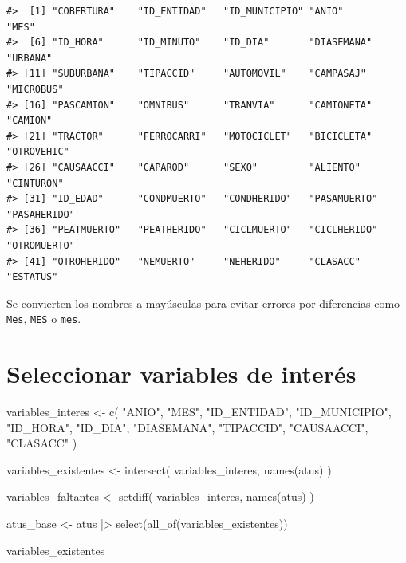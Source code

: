 \documentclass[
  spanish,
  10.5pt,
  letterpaper,
  openany,
  headings=big]{scrbook}
\newenvironment{Shaded}{}{}
\newcommand{\FunctionTok}[1]{\textcolor[rgb]{0.44,0.26,0.76}{#1}}
\newcommand{\NormalTok}[1]{\textcolor[rgb]{0.14,0.16,0.18}{#1}}
\newcommand{\OtherTok}[1]{\textcolor[rgb]{0.44,0.26,0.76}{#1}}
\newcommand{\SpecialCharTok}[1]{\textcolor[rgb]{0.00,0.36,0.77}{#1}}
\newcommand{\StringTok}[1]{\textcolor[rgb]{0.01,0.18,0.38}{#1}}
\begin{document}
\begin{verbatim}
#>  [1] "COBERTURA"    "ID_ENTIDAD"   "ID_MUNICIPIO" "ANIO"         "MES"         
#>  [6] "ID_HORA"      "ID_MINUTO"    "ID_DIA"       "DIASEMANA"    "URBANA"      
#> [11] "SUBURBANA"    "TIPACCID"     "AUTOMOVIL"    "CAMPASAJ"     "MICROBUS"    
#> [16] "PASCAMION"    "OMNIBUS"      "TRANVIA"      "CAMIONETA"    "CAMION"      
#> [21] "TRACTOR"      "FERROCARRI"   "MOTOCICLET"   "BICICLETA"    "OTROVEHIC"   
#> [26] "CAUSAACCI"    "CAPAROD"      "SEXO"         "ALIENTO"      "CINTURON"    
#> [31] "ID_EDAD"      "CONDMUERTO"   "CONDHERIDO"   "PASAMUERTO"   "PASAHERIDO"  
#> [36] "PEATMUERTO"   "PEATHERIDO"   "CICLMUERTO"   "CICLHERIDO"   "OTROMUERTO"  
#> [41] "OTROHERIDO"   "NEMUERTO"     "NEHERIDO"     "CLASACC"      "ESTATUS"
\end{verbatim}

Se convierten los nombres a mayúsculas para evitar errores por
diferencias como \texttt{Mes}, \texttt{MES} o \texttt{mes}.

\section{Seleccionar variables de
interés}\label{seleccionar-variables-de-interuxe9s}

\begin{Shaded}
\begin{Highlighting}[]
\NormalTok{variables\_interes }\OtherTok{\textless{}{-}} \FunctionTok{c}\NormalTok{(}
  \StringTok{"ANIO"}\NormalTok{, }\StringTok{"MES"}\NormalTok{, }\StringTok{"ID\_ENTIDAD"}\NormalTok{, }\StringTok{"ID\_MUNICIPIO"}\NormalTok{,}
  \StringTok{"ID\_HORA"}\NormalTok{, }\StringTok{"ID\_DIA"}\NormalTok{, }\StringTok{"DIASEMANA"}\NormalTok{, }\StringTok{"TIPACCID"}\NormalTok{,}
  \StringTok{"CAUSAACCI"}\NormalTok{, }\StringTok{"CLASACC"}
\NormalTok{)}

\NormalTok{variables\_existentes }\OtherTok{\textless{}{-}} \FunctionTok{intersect}\NormalTok{(}
\NormalTok{  variables\_interes,}
  \FunctionTok{names}\NormalTok{(atus)}
\NormalTok{)}

\NormalTok{variables\_faltantes }\OtherTok{\textless{}{-}} \FunctionTok{setdiff}\NormalTok{(}
\NormalTok{  variables\_interes,}
  \FunctionTok{names}\NormalTok{(atus)}
\NormalTok{)}

\NormalTok{atus\_base }\OtherTok{\textless{}{-}}\NormalTok{ atus }\SpecialCharTok{|\textgreater{}}
  \FunctionTok{select}\NormalTok{(}\FunctionTok{all\_of}\NormalTok{(variables\_existentes))}

\NormalTok{variables\_existentes}
\end{Highlighting}
\end{Shaded}
\end{document}
